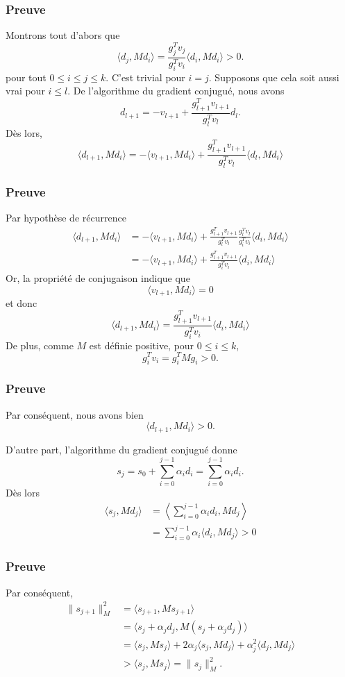 \documentclass[usepdftitle=false,aspectratio=169]{beamer}
\begin{document}
\begin{frame}
\frametitle{Preuve}

Montrons tout d'abors que
$$
\langle d_j, Md_i \rangle
 = \frac{g_j^Tv_j}{g_i^Tv_i}\langle d_i, Md_i \rangle
> 0.
$$
pour tout $0 \leq i \leq j \leq k$.
C'est trivial pour $i = j$.
Supposons que cela soit aussi vrai pour $i \leq l$.
De l'algorithme du gradient conjugué, nous avons
$$
d_{l+1} = -v_{l+1} + \frac{g_{l+1}^Tv_{l+1}}{g_l^Tv_l}d_l.
$$
Dès lors,
$$
\langle d_{l+1}, Md_i \rangle
= -\langle v_{l+1}, Md_i \rangle + \frac{g_{l+1}^Tv_{l+1}}{g_l^Tv_l}\langle d_l, Md_i \rangle
$$

\end{frame}

\begin{frame}
\frametitle{Preuve}

Par hypothèse de récurrence
\begin{align*}
\langle d_{l+1}, Md_i \rangle
&= -\langle v_{l+1}, Md_i \rangle + \frac{g_{l+1}^Tv_{l+1}}{g_l^Tv_l}
\frac{g_l^Tv_l}{g_i^Tv_i}\langle d_i, Md_i \rangle \\
&= -\langle v_{l+1}, Md_i \rangle + \frac{g_{l+1}^Tv_{l+1}}{g_i^Tv_i}\langle d_i, Md_i \rangle
\end{align*}
Or, la propriété de conjugaison indique que
$$
\langle v_{l+1}, Md_i \rangle = 0
$$
et donc
$$
\langle d_{l+1}, Md_i \rangle
= \frac{g_{l+1}^Tv_{l+1}}{g_i^Tv_i}\langle d_i, Md_i \rangle
$$
De plus, comme $M$ est définie positive, pour $0 \leq i \leq k$,
$$
g_i^T v_i = g_i^T M g_i > 0.
$$

\end{frame}

\begin{frame}
\frametitle{Preuve}

Par conséquent, nous avons bien
$$
\langle d_{l+1}, Md_i \rangle > 0.
$$

\mbox{}

D'autre part, l'algorithme du gradient conjugué donne
$$
s_j = s_0 + \sum_{i = 0}^{j-1} \alpha_i d_i = \sum_{i = 0}^{j-1} \alpha_i d_i.
$$
Dès lors
\begin{align*}
\langle s_j, Md_j \rangle
&= \left\langle \sum_{i = 0}^{j-1} \alpha_i d_i, Md_j \right \rangle \\
&= \sum_{i = 0}^{j-1} \alpha_i \langle d_i, Md_j \rangle > 0
\end{align*}

\end{frame}

\begin{frame}
\frametitle{Preuve}

Par conséquent,
\begin{align*}
\| s_{j+1} \|_M^2
&= \langle s_{j+1}, Ms_{j+1} \rangle \\
&= \langle s_j + \alpha_j d_j, M (s_j + \alpha_j d_j) \rangle \\
&= \langle s_j, Ms_j \rangle + 2\alpha_j \langle s_j, Md_j\rangle
+ \alpha_j^2 \langle d_j, Md_j \rangle \\
&> \langle s_j, Ms_j \rangle = 
\| s_j \|_M^2.
\end{align*}

\end{frame}
\end{document}
